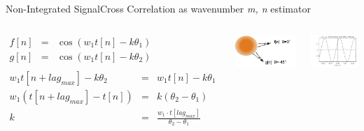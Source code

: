 \documentclass{beamer}
\begin{document}
\begin{frame}{Non-Integrated Signal}{Cross Correlation as wavenumber  \emph{m, n} estimator}
\begin{columns}
{ $ \begin{array}{rcl}
	    		f[n]  &=&  \cos(w_1 t[n ] - k \theta_1 )   \\
			g[n]  &=& \cos(w_1 t[n ] - k \theta_2 ) \\
	   		\end{array}$ }
\~
{ $ \begin{array}{rcl}
	    		w_1 t[n + lag_{max}] - k \theta_2 &=& w_1 t[n ] - k \theta_1    \\
			w_1 (t[n + lag_{max}] -  t[n ])   &=& k ( \theta_2 -\theta_1) \\
			k  &=& \frac{w_1 \cdot t[lag_{max}]}{ \theta_2 -\theta_1}
	   \end{array}$ }
	\begin{center}
	\includegraphics[width=0.9 \columnwidth]{figures/k-wave.png}
	\end{center}
	\begin{center}
	\includegraphics[width=0.9 \columnwidth]{figures/crosscorr.png}
	\end{center}

\end{columns}
\end{frame}
\end{document}
